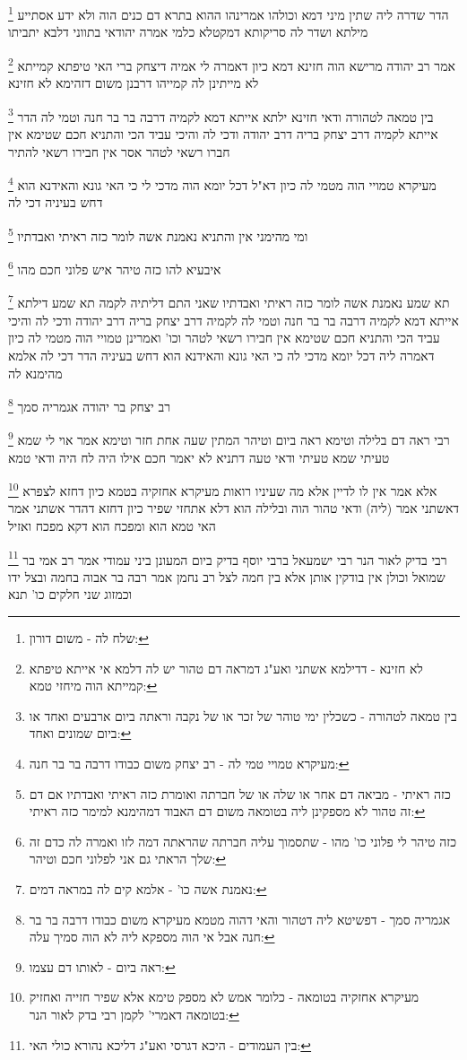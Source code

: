 \documentclass[12pt, openany]{book}
\newcommand{\footnotecomment}[1]{
	\renewcommand\thefootnote{}
	\footnote{#1}}
\newcommand{\commenta}[1]{\footnotecomment{#1}}
\begin{document}
{\commenta{שלח לה - משום דורון:}
הדר שדרה ליה שתין מיני דמא וכולהו אמרינהו ההוא בתרא דם כנים הוה ולא ידע אסתייע מילתא ושדר לה סריקותא דמקטלא כלמי אמרה יהודאי בתווני דלבא יתביתו 
\commenta{לא חזינא - דדילמא אשתני ואע"ג דמראה דם טהור יש לה דלמא אי אייתא טיפתא קמייתא הוה מיחזי טמא:}
אמר רב יהודה מרישא הוה חזינא דמא כיון דאמרה לי אמיה דיצחק ברי האי טיפתא קמייתא לא מייתינן לה קמייהו דרבנן משום דזהימא לא חזינא
\commenta{בין טמאה לטהורה - כשכלין ימי טוהר של זכר או של נקבה וראתה ביום ארבעים ואחד או ביום שמונים ואחד:}
בין טמאה לטהורה ודאי חזינא 
ילתא אייתא דמא לקמיה דרבה בר בר חנה וטמי לה הדר אייתא לקמיה דרב יצחק בריה דרב יהודה ודכי לה 
והיכי עביד הכי והתניא חכם שטימא אין חברו רשאי לטהר אסר אין חבירו רשאי להתיר 
\commenta{מעיקרא טמויי טמי לה - רב יצחק משום כבודו דרבה בר בר חנה:}
מעיקרא טמויי הוה מטמי לה כיון דא"ל דכל יומא הוה מדכי לי כי האי גונא והאידנא הוא דחש בעיניה דכי לה 
\commenta{כזה ראיתי - מביאה דם אחר או שלה או של חברתה ואומרת כזה ראיתי ואבדתיו אם דם זה טהור לא מספקינן ליה בטומאה משום דם האבוד דמהימנא למימר כזה ראיתי: }
ומי מהימני אין והתניא נאמנת אשה לומר כזה ראיתי ואבדתיו 
\commenta{כזה טיהר לי פלוני כו' מהו - שתסמוך עליה חברתה שהראתה דמה לזו ואמרה לה כדם זה שלך הראתי גם אני לפלוני חכם וטיהר:}
איבעיא להו כזה טיהר איש פלוני חכם מהו 
\commenta{נאמנת אשה כו' - אלמא קים לה במראה דמים:}
תא שמע נאמנת אשה לומר כזה ראיתי ואבדתיו שאני התם דליתיה לקמה 
תא שמע דילתא אייתא דמא לקמיה דרבה בר בר חנה וטמי לה לקמיה דרב יצחק בריה דרב יהודה ודכי לה והיכי עביד הכי והתניא חכם שטימא אין חבירו רשאי לטהר וכו' 
ואמרינן טמויי הוה מטמי לה כיון דאמרה ליה דכל יומא מדכי לה כי האי גונא והאידנא הוא דחש בעיניה הדר דכי לה אלמא מהימנא לה 
\commenta{אגמריה סמך - דפשיטא ליה דטהור והאי דהוה מטמא מעיקרא משום כבודו דרבה בר בר חנה אבל אי הוה מספקא ליה לא הוה סמיך עלה:}
רב יצחק בר יהודה אגמריה סמך 
\commenta{ראה ביום - לאותו דם עצמו:}
רבי ראה דם בלילה וטימא ראה ביום וטיהר המתין שעה אחת חזר וטימא אמר אוי לי שמא טעיתי 
שמא טעיתי ודאי טעה דתניא לא יאמר חכם אילו היה לח היה ודאי טמא
\commenta{מעיקרא אחזקיה בטומאה - כלומר אמש לא מספק טימא אלא שפיר חזייה ואחזיק בטומאה דאמרי' לקמן רבי בדק לאור הנר:}
אלא אמר אין לו לדיין אלא מה שעיניו רואות מעיקרא אחזקיה בטמא כיון דחזא לצפרא דאשתני אמר (ליה) ודאי טהור הוה ובלילה הוא דלא אתחזי שפיר כיון דחזא דהדר אשתני אמר האי טמא הוא ומפכח הוא דקא מפכח ואזיל 
\commenta{בין העמודים - היכא דגרסי ואע"ג דליכא נהורא כולי האי:}
רבי בדיק לאור הנר רבי ישמעאל ברבי יוסף בדיק ביום המעונן ביני עמודי אמר רב אמי בר שמואל וכולן אין בודקין אותן אלא בין חמה לצל רב נחמן אמר רבה בר אבוה בחמה ובצל ידו
וכמזוג שני חלקים כו' תנא
\clearpage}
\end{document}

